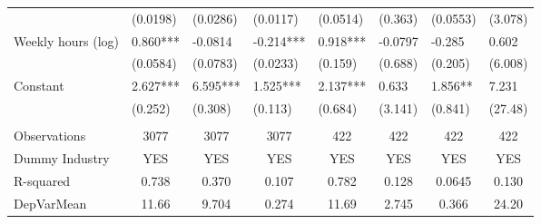 \begin{tabular}{lccc|cccc}
      & \multicolumn{1}{l}{(0.0198)} & \multicolumn{1}{l}{(0.0286)} & \multicolumn{1}{l|}{(0.0117)} & \multicolumn{1}{l}{(0.0514)} & \multicolumn{1}{l}{(0.363)} & \multicolumn{1}{l}{(0.0553)} & \multicolumn{1}{l}{(3.078)} \\
Weekly hours (log) & \multicolumn{1}{l}{0.860***} & \multicolumn{1}{l}{-0.0814} & \multicolumn{1}{l|}{-0.214***} & \multicolumn{1}{l}{0.918***} & \multicolumn{1}{l}{-0.0797} & \multicolumn{1}{l}{-0.285} & \multicolumn{1}{l}{0.602} \\
      & \multicolumn{1}{l}{(0.0584)} & \multicolumn{1}{l}{(0.0783)} & \multicolumn{1}{l|}{(0.0233)} & \multicolumn{1}{l}{(0.159)} & \multicolumn{1}{l}{(0.688)} & \multicolumn{1}{l}{(0.205)} & \multicolumn{1}{l}{(6.008)} \\
Constant & \multicolumn{1}{l}{2.627***} & \multicolumn{1}{l}{6.595***} & \multicolumn{1}{l|}{1.525***} & \multicolumn{1}{l}{2.137***} & \multicolumn{1}{l}{0.633} & \multicolumn{1}{l}{1.856**} & \multicolumn{1}{l}{7.231} \\
      & \multicolumn{1}{l}{(0.252)} & \multicolumn{1}{l}{(0.308)} & \multicolumn{1}{l|}{(0.113)} & \multicolumn{1}{l}{(0.684)} & \multicolumn{1}{l}{(3.141)} & \multicolumn{1}{l}{(0.841)} & \multicolumn{1}{l}{(27.48)} \\
      &       &       &       &       &       &       &  \\
\midrule
Observations & 3077  & 3077  & 3077  & 422   & 422   & 422   & 422 \\
Dummy Industry & YES   & YES   & YES   & YES   & YES   & YES   & YES \\
R-squared & 0.738 & 0.370 & 0.107 & 0.782 & 0.128 & 0.0645 & 0.130 \\
DepVarMean & 11.66 & 9.704 & 0.274 & 11.69 & 2.745 & 0.366 & 24.20 \\
\bottomrule
\bottomrule
\end{tabular}%
